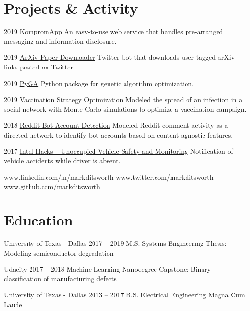 \documentclass{tccv}
\begin{document}
\section{Projects \& Activity}
\begin{yearlist}
	\item {2019}
	{\href{https://github.com/markditsworth/kompromapp}{KompromApp}}
	{An easy-to-use web service that handles pre-arranged messaging and information disclosure.}
	
	\item{2019}
	{\href{https://github.com/markditsworth/PaperDownload}{ArXiv Paper Downloader}}
	{Twitter bot that downloads user-tagged arXiv links posted on Twitter.}
	
	\item{2019}
	{\href{https://github.com/markditsworth/PyGA}{PyGA}}
	{Python package for genetic algorithm optimization.}
	
	\item{2019}
	{\href{https://towardsdatascience.com/infection-modeling-part-1-87e74645568a}{Vaccination Strategy Optimization}}
	{Modeled the spread of an infection in a social network with Monte Carlo simulations to optimize a vaccination campaign.}
	
	\item{2018}
	{\href{https://chatbotslife.com/bot-detection-with-network-science-dde6525005f2}{Reddit Bot Account Detection}}
	{Modeled Reddit comment activity as a directed network to identify bot accounts based on content agnostic features.}
	
	\item{2017}
	{\href{https://devpost.com/software/unoccupied-vehicle-safety-and-monitoringg}{Intel Hacks -- Unoccupied Vehicle Safety and Monitoring}}
	{Notification of vehicle accidents while driver is absent.}
	
\end{yearlist}

    {www.linkedin.com/in/markditsworth}
    {www.twitter.com/markditsworth}
    {www.github.com/markditsworth}

\section{Education}

\begin{yearlist}

\item[University of Texas - Dallas]{2017 -- 2019}
     {M.S. Systems Engineering}
     {Thesis: Modeling semiconductor degradation}
     
\item[Udacity]{2017 -- 2018}
	 {Machine Learning Nanodegree}
	 {Capstone: Binary classification of manufacturing defects}

\item[University of Texas - Dallas]{2013 -- 2017}
     {B.S. Electrical Engineering}
     {Magna Cum Laude}

\end{yearlist}
\end{document}
